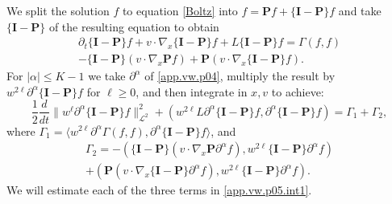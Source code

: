 \documentclass{amsart}
\numberwithin{equation}{section}
\begin{document}
 We split the solution ${f}$ to equation \eqref{Boltz} into ${f}={\mathbf{P}} {f} + \{{\mathbf{I}}-{\mathbf{P}}\}{f}$ and take
$\{{\mathbf{I}}-{\mathbf{P}}\}$ of the resulting equation to obtain
\begin{multline}\label{app.vw.p04}
{\partial}_t \{{\mathbf{I}}-{\mathbf{P}}\}{f} + {v} \cdot {\nabla}_x \{{\mathbf{I}}-{\mathbf{P}}\}{f} 
+
{L}\{{\mathbf{I}}-{\mathbf{P}}\} {f} 
=
{\Gamma}({f},{f})
 \\
-\{{\mathbf{I}}-{\mathbf{P}}\}({v} \cdot {\nabla}_x {\mathbf{P}} {f} )
 +{\mathbf{P}} ({v} \cdot {\nabla}_x \{{\mathbf{I}}-{\mathbf{P}}\}{f}).
\end{multline}
For $|{\alpha}|\le {K}-1$ we take ${\partial}^{\alpha}$ of \eqref{app.vw.p04}, multiply the result by $w^{2{\ell}}{\partial}^{\alpha}\{{\mathbf{I}}-{\mathbf{P}}\}{f}$ for ${\ell} \ge 0$, and then integrate in $x,{v}$ to achieve:
\begin{equation}
\label{app.vw.p05.int1}
\frac{1}{2}\frac{d}{dt}\|w^{\ell}{\partial}^{\alpha}\{{\mathbf{I}}-{\mathbf{P}}\}{f}\|_{{\mathcal{L}}^2}^2 +
 \left( w^{2{\ell}}{L}{\partial}^{\alpha}\{{\mathbf{I}}-{\mathbf{P}}\}{f},{\partial}^{\alpha}\{{\mathbf{I}}-{\mathbf{P}}\} {f}\right)
 =
 {\Gamma}_1+ {\Gamma}_2,
\end{equation}
where $ {\Gamma}_1 =  \langle w^{2{\ell}} {\partial}^{\alpha}{\Gamma}({f},{f}),{\partial}^{\alpha}\{{\mathbf{I}}-{\mathbf{P}}\} {f}\rangle$,
and
\begin{multline*}
 {\Gamma}_2 =
-\left(
\{{\mathbf{I}}-{\mathbf{P}}\}({v} \cdot {\nabla}_x {\mathbf{P}}{\partial}^{\alpha} {f} ),
w^{2{\ell}} \{{\mathbf{I}}-{\mathbf{P}}\}{\partial}^{\alpha}{f}
\right)
\\
 +\left(
 {\mathbf{P}} ({v} \cdot {\nabla}_x \{{\mathbf{I}}-{\mathbf{P}}\}{\partial}^{\alpha}{f}),
w^{2{\ell}}  \{{\mathbf{I}}-{\mathbf{P}}\}{\partial}^{\alpha}{f}  \right).
\end{multline*}
We will estimate each of the three terms in \eqref{app.vw.p05.int1}.
\end{document}
